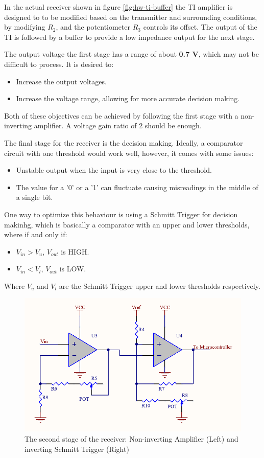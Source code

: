 In the actual receiver shown in figure \ref{fig:hw-ti-buffer} the TI amplifier is designed to to be modified based on the transmitter and surrounding conditions, by modifying $R_2$, and the potentiometer $R_3$ controls its offset. The output of the TI is followed by a buffer to provide a low impedance output for the next stage. \cite{op-amp-circuits} 

The output voltage the first stage has a range of about \textbf{0.7 V}, which may not be difficult to process. It is desired to: 
\begin{itemize}
	\item Increase the output voltages.
	\item Increase the voltage range, allowing for more accurate decision making. 
\end{itemize}
Both of these objectives can be achieved by following the first stage with a non-inverting amplifier. A voltage gain ratio of 2 should be enough.

The final stage for the receiver is the decision making. Ideally, a comparator circuit with one threshold would work well, however, it comes with some issues:
\begin{itemize}
	\item Unstable output when the input is very close to the threshold.
	\item The value for a '0' or a '1' can fluctuate causing misreadings in the middle of a single bit.
\end{itemize}

One way to optimize this behaviour is using a Schmitt Trigger for decision makinhg, which is basically a comparator with an upper and lower thresholds, where if and only if:
\begin{itemize}
	\item $V_{in} > V_u$, $V_{out}$ is HIGH. 
	\item $V_{in} < V_l$, $V_{out}$ is LOW. 
\end{itemize}
Where $V_u$ and $V_l$ are the Schmitt Trigger upper and lower thresholds respectively.

\newpage

\begin{figure}[h!]
	\centering
	\includegraphics[scale=0.45]{Figures/HW/amp-schmitt.png}
	\caption{The second stage of the receiver: Non-inverting Amplifier (Left) and inverting Schmitt Trigger (Right)}
	\label{fig:hw-amp-schmitt}
\end{figure}

